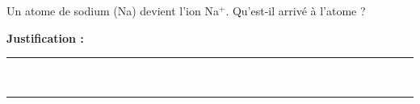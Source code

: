 Un atome de sodium (Na) devient l'ion Na$^+$. Qu'est-il arrivé à l'atome ?

\choices

\noindent\textbf{Justification :} \hrulefill \\[2.5ex]
\rule{\linewidth}{0.4pt} \\[2.5ex]
\rule{\linewidth}{0.4pt}
\vfill
